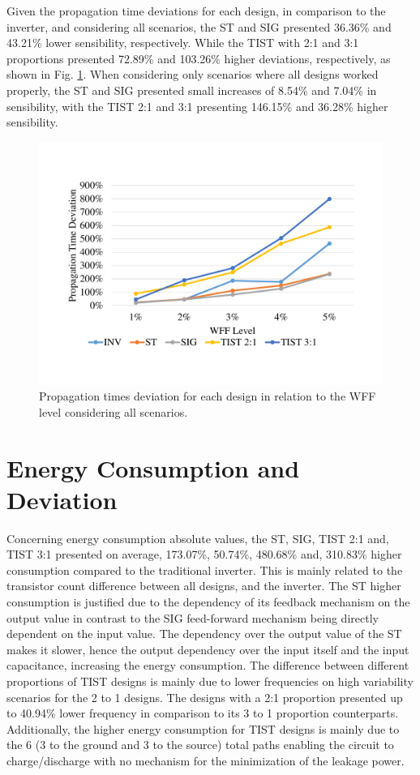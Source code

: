 \documentclass[pgmicro,mestrado,english]{iiufrgs}
\begin{document}
Given the propagation time deviations for each design, in comparison to the inverter, and considering all scenarios, the ST and SIG presented 36.36\% and 43.21\% lower sensibility, respectively. While the TIST with 2:1 and 3:1 proportions presented 72.89\% and 103.26\% higher deviations, respectively, as shown in Fig. \ref{fig:delaysDev}. When considering only scenarios where all designs worked properly, the ST and SIG presented small increases of 8.54\% and 7.04\% in sensibility, with the TIST 2:1 and 3:1 presenting 146.15\% and 36.28\% higher sensibility.

    \begin{figure}[]
        \centering
            \includegraphics[width=\textwidth, trim={2cm 3cm 2cm 3cm}, clip]{delayDevWFF.pdf}
            \caption{Propagation times deviation for each design in relation to the WFF level considering all scenarios.}
        \label{fig:delaysDev}
    \end{figure}

\section{Energy Consumption and Deviation}
    Concerning energy consumption absolute values, the ST, SIG, TIST 2:1 and, TIST 3:1 presented on average, 173.07\%, 50.74\%, 480.68\% and, 310.83\% higher consumption compared to the traditional inverter. This is mainly related to the transistor count difference between all designs, and the inverter. The ST higher consumption is justified due to the dependency of its feedback mechanism on the output value in contrast to the SIG feed-forward mechanism being directly dependent on the input value. The dependency over the output value of the ST makes it slower, hence the output dependency over the input itself and the input capacitance, increasing the energy consumption. The difference between different proportions of TIST designs is mainly due to lower frequencies on high variability scenarios for the 2 to 1 designs. The designs with a 2:1 proportion presented up to 40.94\% lower frequency in comparison to its 3 to 1 proportion counterparts. Additionally, the higher energy consumption for TIST designs is mainly due to the 6 (3 to the ground and 3 to the source) total paths enabling the circuit to charge/discharge with no mechanism for the minimization of the leakage power.
    
\end{document}
